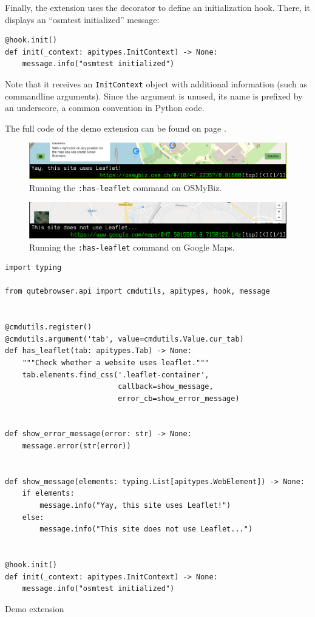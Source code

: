 Finally, the extension uses the  decorator to define an
initialization hook. There, it displays an ``osmtest initialized'' message:

\begin{verbatim}
@hook.init()
def init(_context: apitypes.InitContext) -> None:
    message.info("osmtest initialized")
\end{verbatim}

Note that it receives an \verb|InitContext| object with additional information
(such as commandline arguments). Since the argument is unused, its name is
prefixed by an underscore, a common convention in Python code.

The full code of the demo extension can be found on page \pageref{lst:demo}.\\[2em]

\begin{figure}[H]
  \centering
  \includegraphics[width=\linewidth]{img/screenshot-leaflet.png}
  \caption{Running the \texttt{:has-leaflet} command on OSMyBiz.}
\end{figure}

\begin{figure}[H]
  \centering
  \includegraphics[width=\linewidth]{img/screenshot-leaflet-no.png}
  \caption{Running the \texttt{:has-leaflet} command on Google Maps.}
\end{figure}


\begin{listing}[p]
\centering
\begin{verbatim}
import typing

from qutebrowser.api import cmdutils, apitypes, hook, message


@cmdutils.register()
@cmdutils.argument('tab', value=cmdutils.Value.cur_tab)
def has_leaflet(tab: apitypes.Tab) -> None:
    """Check whether a website uses leaflet."""
    tab.elements.find_css('.leaflet-container',
                          callback=show_message,
                          error_cb=show_error_message)


def show_error_message(error: str) -> None:
    message.error(str(error))


def show_message(elements: typing.List[apitypes.WebElement]) -> None:
    if elements:
        message.info("Yay, this site uses Leaflet!")
    else:
        message.info("This site does not use Leaflet...")


@hook.init()
def init(_context: apitypes.InitContext) -> None:
    message.info("osmtest initialized")
\end{verbatim}
\caption{Demo extension}
\label{lst:demo}
\end{listing}

